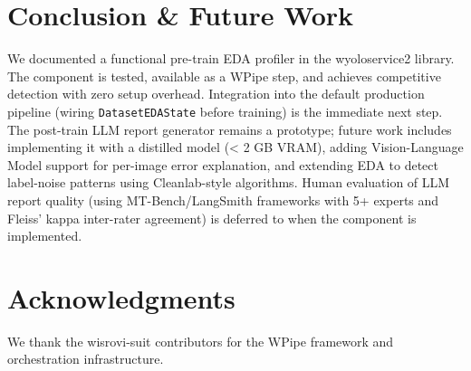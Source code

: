 \documentclass[10pt,twocolumn,letterpaper]{article}
\begin{document}
\section{Conclusion \& Future Work}
We documented a functional pre-train EDA profiler in the wyoloservice2 library. The component is tested, available as a WPipe step, and achieves competitive detection with zero setup overhead. Integration into the default production pipeline (wiring \texttt{DatasetEDAState} before training) is the immediate next step. The post-train LLM report generator remains a prototype; future work includes implementing it with a distilled model (< 2 GB VRAM), adding Vision-Language Model support for per-image error explanation, and extending EDA to detect label-noise patterns using Cleanlab-style algorithms. Human evaluation of LLM report quality (using MT-Bench/LangSmith frameworks with 5+ experts and Fleiss' kappa inter-rater agreement) is deferred to when the component is implemented.

\section{Acknowledgments}
We thank the wisrovi-suit contributors for the WPipe framework and orchestration infrastructure.



\end{document}
